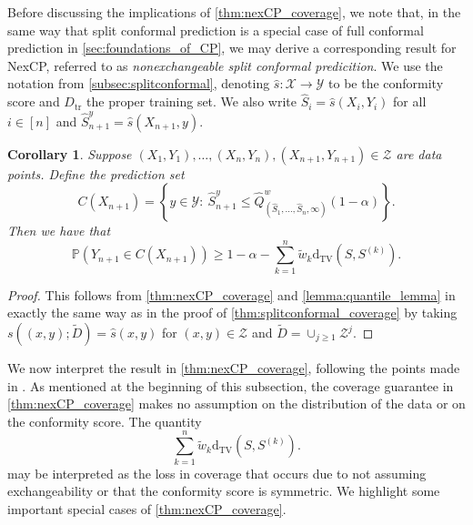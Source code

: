 \documentclass[11pt, titlepage]{article} %
\newcommand{\R}{\mathrm}
\newcommand{\Prob}[1]{\mathbb{P}\left( #1 \right)}
\numberwithin{equation}{section}
\newtheorem{corollary}{Corollary}
\theoremstyle{definition}
\numberwithin{theorem}{section}
\numberwithin{lemma}{section}
\numberwithin{corollary}{section}
\numberwithin{proposition}{section}
\numberwithin{definition}{section}
\numberwithin{remark}{section}
\begin{document}
\noindent
Before discussing the implications of \cref{thm:nexCP_coverage}, we note that, in the same way that split conformal prediction is a special case of full conformal prediction in \cref{sec:foundations_of_CP}, we may derive a corresponding result for NexCP, referred to as \textit{nonexchangeable split conformal predicition}. We use the notation from \cref{subsec:splitconformal}, denoting \(\hat{s}:\mathcal{X} \to \mathcal{Y}\) to be the conformity score and \(D_\R{tr}\) the proper training set. We also write \(\hat{S}_i = \hat{s}(X_i, Y_i)\) for all \(i \in [n]\) and \(\hat{S}_{n+1}^y = \hat{s}(X_{n+1}, y)\).

\begin{corollary}
    Suppose \((X_1, Y_1), \ldots, (X_n, Y_n), (X_{n+1}, Y_{n+1}) \in \mathcal{Z}\) are data points. Define the prediction set \begin{equation}
        C(X_{n+1}) = \left\{ y \in \mathcal{Y}: \  \hat{S}_{n+1}^y \leq \hat{Q}^w_{(\hat{S}_1, \ldots, \hat{S}_n, \infty)}(1-\alpha)  \right\}.
    \label{eqn:nexCP_split_prediction_set}
    \end{equation} Then we have that \[\Prob{Y_{n+1} \in C(X_{n+1})}  \geq 1-\alpha - \sum_{k=1}^n \tilde{w}_k \R{d_{TV}}(S, S^{(k)}).\]
\label{corr:nexCP_split}
\end{corollary}
\begin{proof}
    This follows from \cref{thm:nexCP_coverage} and \cref{lemma:quantile_lemma} in exactly the same way as in the proof of \cref{thm:splitconformal_coverage} by taking \(s((x,y); \tilde{D}) = \hat{s}(x,y)\) for \((x,y) \in \mathcal{Z}\) and \(\tilde{D} = \cup_{j \geq 1} \mathcal{Z}^j.\)
\end{proof}

\noindent
We now interpret the result in \cref{thm:nexCP_coverage}, following the points made in \cite{barber2023conformalbeyondexch}. As mentioned at the beginning of this subsection, the coverage guarantee in \cref{thm:nexCP_coverage} makes no assumption on the distribution of the data or on the conformity score. The quantity \begin{equation}
    \sum_{k=1}^{n} \tilde{w}_k \R{d_{TV}}(S, S^{(k)}).
\label{eqn:nexCP_loss_coverage}
\end{equation} may be interpreted as the loss in coverage that occurs due to not assuming exchangeability or that the conformity score is symmetric. We highlight some important special cases of \cref{thm:nexCP_coverage}.
\end{document}

